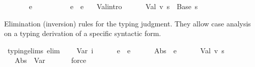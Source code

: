 \begin{isabellebody}
\ \ \ \ \ {\isasymGamma}\ {\isasymturnstile}\ e{}\ {\isacharcolon}{\kern0pt}\ {\isasymtau}{}\ {\isasymLongrightarrow}\isanewline
\ \ \ \ \ {\isasymGamma}\ {\isasymturnstile}\ e{}\ {\isasymcdot}\ e{}\ {\isacharcolon}{\kern0pt}\ {\isasymtau}{}{\isachardoublequoteclose}\isanewline
{\isacharbar}{\kern0pt}\ Val{\isacharbrackleft}{\kern0pt}intro{\isacharbang}{\kern0pt}{\isacharbrackright}{\kern0pt}{\isacharcolon}{\kern0pt}\isanewline
\ \ \ \ {\isachardoublequoteopen}{\isasymGamma}\ {\isasymturnstile}\ {\isacharparenleft}{\kern0pt}Val\ v\ s{\isacharparenright}{\kern0pt}\ {\isacharcolon}{\kern0pt}\ {\isacharparenleft}{\kern0pt}Base\ s{\isacharparenright}{\kern0pt}{\isachardoublequoteclose}%
\begin{isamarkuptext}%
Elimination (inversion) rules for the typing judgment.
  They allow case analysis on a typing derivation of a specific syntactic form.%
\end{isamarkuptext}\isamarkuptrue%
\isamarkupfalse%
\ typing{\isacharunderscore}{\kern0pt}elims\ {\isacharbrackleft}{\kern0pt}elim{\isacharbang}{\kern0pt}{\isacharbrackright}{\kern0pt}{\isacharcolon}{\kern0pt}\isanewline
\ \ {\isachardoublequoteopen}{\isasymGamma}\ {\isasymturnstile}\ Var\ i\ {\isacharcolon}{\kern0pt}\ {\isasymtau}{\isachardoublequoteclose}\isanewline
\ \ {\isachardoublequoteopen}{\isasymGamma}\ {\isasymturnstile}\ e{}\ {\isasymcdot}\ e{}\ {\isacharcolon}{\kern0pt}\ {\isasymtau}{\isachardoublequoteclose}\isanewline
\ \ {\isachardoublequoteopen}{\isasymGamma}\ {\isasymturnstile}\ Abs\ {\isasymtau}{}\ e\ {\isacharcolon}{\kern0pt}\ {\isasymtau}{\isachardoublequoteclose}\isanewline
\ \ {\isachardoublequoteopen}{\isasymGamma}\ {\isasymturnstile}\ Val\ v\ s\ {\isacharcolon}{\kern0pt}\ {\isasymtau}{\isachardoublequoteclose}%
\isadelimdocument
%
\endisadelimdocument
%
\isatagdocument
%
\isamarkuptrue%
%
\endisatagdocument
{\isafolddocument}%
%
\isadelimdocument
%
\endisadelimdocument
{}\isamarkupfalse%
\ {\isachardoublequoteopen}{\isasymGamma}\ {\isasymturnstile}\ Abs\ {\isasymtau}{}\ {\isacharparenleft}{\kern0pt}Var\ {}{\isacharparenright}{\kern0pt}\ {\isacharcolon}{\kern0pt}\ {\isacharquery}{\kern0pt}{\isasymtau}{\isachardoublequoteclose}\isanewline
%
\isadelimproof
\ \ %
\endisadelimproof
%
\isatagproof
{}\isamarkupfalse%
\ force%
\endisatagproof

\end{isabellebody}
